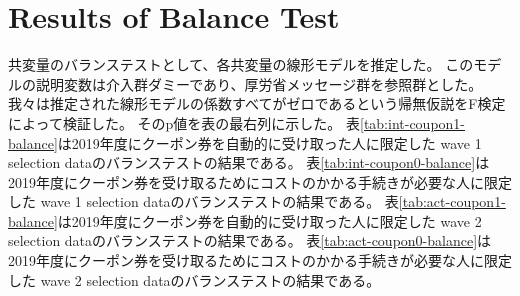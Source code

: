 \documentclass[
  11pt,
  a4paper,
]{article}
\begin{document}
\clearpage

\hypertarget{results-of-balance-test}{%
\section{Results of Balance Test}\label{results-of-balance-test}}

共変量のバランステストとして、各共変量の線形モデルを推定した。
このモデルの説明変数は介入群ダミーであり、厚労省メッセージ群を参照群とした。
我々は推定された線形モデルの係数すべてがゼロであるという帰無仮説をF検定によって検証した。
そのp値を表の最右列に示した。
表\ref{tab:int-coupon1-balance}は2019年度にクーポン券を自動的に受け取った人に限定した
wave 1 selection dataのバランステストの結果である。
表\ref{tab:int-coupon0-balance}は
2019年度にクーポン券を受け取るためにコストのかかる手続きが必要な人に限定した
wave 1 selection dataのバランステストの結果である。
表\ref{tab:act-coupon1-balance}は2019年度にクーポン券を自動的に受け取った人に限定した
wave 2 selection dataのバランステストの結果である。
表\ref{tab:act-coupon0-balance}は
2019年度にクーポン券を受け取るためにコストのかかる手続きが必要な人に限定した
wave 2 selection dataのバランステストの結果である。

\clearpage
\end{document}
